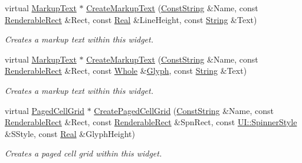 \begin{DoxyCompactItemize}
virtual \hyperlink{classMezzanine_1_1UI_1_1MarkupText}{MarkupText} $\ast$ \hyperlink{classMezzanine_1_1UI_1_1RenderableContainerWidget_a42be1f21bd23eaca548243d94e25009b}{CreateMarkupText} (\hyperlink{namespaceMezzanine_a63cd699ac54b73953f35ec9cfc05e506}{ConstString} \&Name, const \hyperlink{structMezzanine_1_1UI_1_1RenderableRect}{RenderableRect} \&Rect, const \hyperlink{namespaceMezzanine_a726731b1a7df72bf3583e4a97282c6f6}{Real} \&LineHeight, const \hyperlink{namespaceMezzanine_acf9fcc130e6ebf08e3d8491aebcf1c86}{String} \&Text)
\begin{DoxyCompactList}\small\item\em Creates a markup text within this widget. \item\end{DoxyCompactList}\item 
virtual \hyperlink{classMezzanine_1_1UI_1_1MarkupText}{MarkupText} $\ast$ \hyperlink{classMezzanine_1_1UI_1_1RenderableContainerWidget_a7c70dd9a1404fd9ae3a95bc7e6613349}{CreateMarkupText} (\hyperlink{namespaceMezzanine_a63cd699ac54b73953f35ec9cfc05e506}{ConstString} \&Name, const \hyperlink{structMezzanine_1_1UI_1_1RenderableRect}{RenderableRect} \&Rect, const \hyperlink{namespaceMezzanine_adcbb6ce6d1eb4379d109e51171e2e493}{Whole} \&\hyperlink{classMezzanine_1_1UI_1_1Glyph}{Glyph}, const \hyperlink{namespaceMezzanine_acf9fcc130e6ebf08e3d8491aebcf1c86}{String} \&Text)
\begin{DoxyCompactList}\small\item\em Creates a markup text within this widget. \item\end{DoxyCompactList}\item 
virtual \hyperlink{classMezzanine_1_1UI_1_1PagedCellGrid}{PagedCellGrid} $\ast$ \hyperlink{classMezzanine_1_1UI_1_1RenderableContainerWidget_a304bcbffecb97c9f07ad3c21f112a9e9}{CreatePagedCellGrid} (\hyperlink{namespaceMezzanine_a63cd699ac54b73953f35ec9cfc05e506}{ConstString} \&Name, const \hyperlink{structMezzanine_1_1UI_1_1RenderableRect}{RenderableRect} \&Rect, const \hyperlink{structMezzanine_1_1UI_1_1RenderableRect}{RenderableRect} \&SpnRect, const \hyperlink{namespaceMezzanine_1_1UI_a62462d4df783dcdda77e1590a96bc6d6}{UI::SpinnerStyle} \&SStyle, const \hyperlink{namespaceMezzanine_a726731b1a7df72bf3583e4a97282c6f6}{Real} \&GlyphHeight)
\begin{DoxyCompactList}\small\item\em Creates a paged cell grid within this widget. \item\end{DoxyCompactList}\item 

\end{DoxyCompactItemize}
